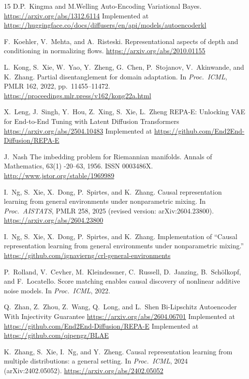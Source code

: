 \begin{thebibliography}{15}
D.P.~Kingma and M.Welling
\newblock Auto-Encoding Variational Bayes.
\newblock \url{https://arxiv.org/abs/1312.6114}
\newblock Implemented at \url{https://huggingface.co/docs/diffusers/en/api/models/autoencoderkl}

F.~Koehler, V.~Mehta, and A.~Risteski.
\newblock Representational aspects of depth and conditioning in normalizing flows.
\newblock \url{https://arxiv.org/abs/2010.01155}

L.~Kong, S.~Xie, W.~Yao, Y.~Zheng, G.~Chen, P.~Stojanov, V.~Akinwande, and K.~Zhang.
\newblock Partial disentanglement for domain adaptation.
\newblock In \emph{Proc.\ ICML}, PMLR 162, 2022, pp.~11455--11472.
\newblock \url{https://proceedings.mlr.press/v162/kong22a.html}

X.~Leng, J.~Singh, Y.~Hou, Z.~Xing, S.~Xie, L.~Zheng
\newblock REPA-E: Unlocking VAE for End-to-End Tuning with Latent Diffusion Transformers
\newblock \url{https://arxiv.org/abs/2504.10483}
\newblock Implemented at \url{https://github.com/End2End-Diffusion/REPA-E}

J.~Nash 
\newblock The imbedding problem for Riemannian manifolds. 
\newblock Annals of Mathematics, 63(1) -20–63, 1956. ISSN 0003486X. 
\newblock \url{http://www.jstor.org/stable/1969989}

I.~Ng, S.~Xie, X.~Dong, P.~Spirtes, and K.~Zhang.
\newblock Causal representation learning from general environments under nonparametric mixing.
\newblock In \emph{Proc.\ AISTATS}, PMLR 258, 2025 (revised version: arXiv:2604.23800).
\newblock \url{https://arxiv.org/abs/2604.23800}

I.~Ng, S.~Xie, X.~Dong, P.~Spirtes, and K.~Zhang.
\newblock Implementation of ``Causal representation learning from general environments under nonparametric mixing.''
\newblock \url{https://github.com/ignavierng/crl-general-environments}

P.~Rolland, V.~Cevher, M.~Kleindessner, C.~Russell, D.~Janzing, B.~Sch{\"o}lkopf, and F.~Locatello.
\newblock Score matching enables causal discovery of nonlinear additive noise models.
\newblock In \emph{Proc.\ ICML}, 2022.

Q.~Zhan, Z.~Zhou, Z.~Wang, Q.~Long, and L.~Shen
\newblock Bi-Lipschitz Autoencoder With Injectivity Guarantee
\newblock \url{https://arxiv.org/abs/2604.06701}
\newblock Implemented at \url{https://github.com/End2End-Diffusion/REPA-E}
\newblock Implemented at \url{https://github.com/qipengz/BLAE}


K.~Zhang, S.~Xie, I.~Ng, and Y.~Zheng.
\newblock Causal representation learning from multiple distributions: a general setting.
\newblock In \emph{Proc.\ ICML}, 2024 (arXiv:2402.05052).
\newblock \url{https://arxiv.org/abs/2402.05052}

\end{thebibliography}